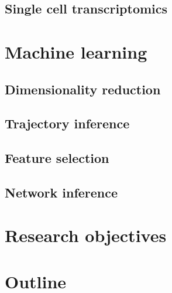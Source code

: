 \subsection{Single cell transcriptomics}

\section{Machine learning}

\subsection{Dimensionality reduction}

\subsection{Trajectory inference}

\subsection{Feature selection}

\subsection{Network inference}

\section{Research objectives}

\section{Outline} %